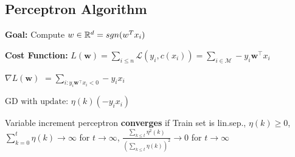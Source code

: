 \subsection{Perceptron Algorithm}
	\textbf{Goal:} Compute $w\in\mathbb R^d = sgn(w^Tx_i)$
	
	\textbf{Cost Function: } $L(\mathbf{w})=\sum_{i\leq n}\mathcal{L}(y_i,c(x_i))
	=\sum_{i\in\mathcal{M}}-y_i\mathbf{w}^\intercal x_i$
	
	$\nabla L(\mathbf{w})$ 
	$=\sum_{i:y_i\mathbf{w}^\intercal x_i < 0} -y_ix_i$ 
	
	$\text{GD with update: }\eta(k)(-y_ix_i)$

\sepline


Variable increment perceptron \textbf{converges} if
	 Train set is lin.sep., 
	 $\eta(k) \geq 0$, 
	 $\sum_{k=0}^t\eta(k) \to \infty$ for $t\to\infty$,
 $\frac{\sum_{k\leq t}\eta^2(k)}{\left(\sum_{k\leq t}\eta(k)\right)^2}\to 0$ for $t\to\infty$




